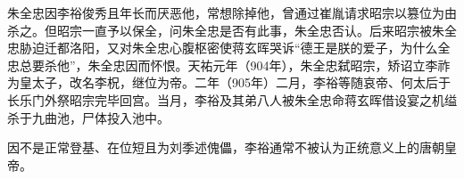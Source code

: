 朱全忠因李{\fzk 𥙿}俊秀且年长而厌恶他，常想除掉他，曾通过崔胤请求昭宗以篡位为由杀之。但昭宗一直予以保全，问朱全忠是否有此事，朱全忠否认。后来昭宗被朱全忠胁迫迁都洛阳，又对朱全忠心腹枢密使蒋玄晖哭诉“德王是朕的爱子，为什么全忠总要杀他”，朱全忠因而怀恨。天祐元年（904年），朱全忠弑昭宗，矫诏立李祚为皇太子，改名李柷，继位为帝。二年（905年）二月，李{\fzk 𥙿}等随哀帝、何太后于长乐门外祭昭宗完毕回宫。当月，李{\fzk 𥙿}及其弟八人被朱全忠命蒋玄晖借设宴之机缢杀于九曲池，尸体投入池中。

因不是正常登基、在位短且为刘季述傀儡，李{\fzk 𥙿}通常不被认为正统意义上的唐朝皇帝。


